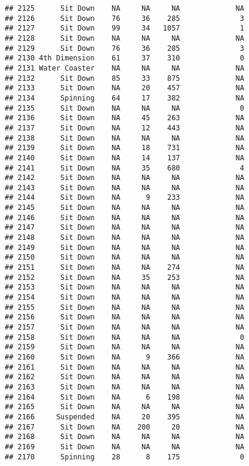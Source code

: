 \documentclass[
]{article}
\begin{document}
\begin{verbatim}
## 2125      Sit Down    NA     NA     NA             NA
## 2126      Sit Down    76     36    285              3
## 2127      Sit Down    99     34   1057              1
## 2128      Sit Down    NA     NA     NA             NA
## 2129      Sit Down    76     36    285              3
## 2130 4th Dimension    61     37    310              0
## 2131 Water Coaster    NA     NA     NA             NA
## 2132      Sit Down    85     33    875             NA
## 2133      Sit Down    NA     20    457             NA
## 2134      Spinning    64     17    382             NA
## 2135      Sit Down    NA     NA     NA              0
## 2136      Sit Down    NA     45    263             NA
## 2137      Sit Down    NA     12    443             NA
## 2138      Sit Down    NA     NA     NA             NA
## 2139      Sit Down    NA     18    731             NA
## 2140      Sit Down    NA     14    137             NA
## 2141      Sit Down    NA     35    680              4
## 2142      Sit Down    NA     NA     NA             NA
## 2143      Sit Down    NA     NA     NA             NA
## 2144      Sit Down    NA      9    233             NA
## 2145      Sit Down    NA     NA     NA             NA
## 2146      Sit Down    NA     NA     NA             NA
## 2147      Sit Down    NA     NA     NA             NA
## 2148      Sit Down    NA     NA     NA             NA
## 2149      Sit Down    NA     NA     NA             NA
## 2150      Sit Down    NA     NA     NA             NA
## 2151      Sit Down    NA     NA    274             NA
## 2152      Sit Down    NA     35    253             NA
## 2153      Sit Down    NA     NA     NA             NA
## 2154      Sit Down    NA     NA     NA             NA
## 2155      Sit Down    NA     NA     NA             NA
## 2156      Sit Down    NA     NA     NA             NA
## 2157      Sit Down    NA     NA     NA             NA
## 2158      Sit Down    NA     NA     NA              0
## 2159      Sit Down    NA     NA     NA             NA
## 2160      Sit Down    NA      9    366             NA
## 2161      Sit Down    NA     NA     NA             NA
## 2162      Sit Down    NA     NA     NA             NA
## 2163      Sit Down    NA     NA     NA             NA
## 2164      Sit Down    NA      6    198             NA
## 2165      Sit Down    NA     NA     NA             NA
## 2166     Suspended    NA     20    395             NA
## 2167      Sit Down    NA    200     20             NA
## 2168      Sit Down    NA     NA     NA             NA
## 2169      Sit Down    NA     NA     NA             NA
## 2170      Spinning    28      8    175              0

\end{verbatim}
\end{document}
